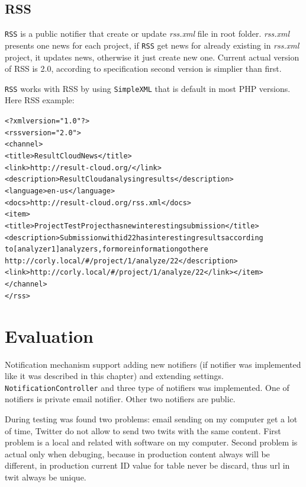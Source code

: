 \subsection{RSS}

\texttt{RSS} is a public notifier that create or update \emph{rss.xml} file in root folder. \emph{rss.xml} presents one news for each project, if \texttt{RSS} get news for already existing in \emph{rss.xml} project, it updates news, otherwise it just create new one. Current actual version of RSS is 2.0, according to specification \cite{rss} second version is simplier than first.

\texttt{RSS} works with RSS by using \texttt{SimpleXML} that is default in most PHP versions. Here RSS example:
\begin{alltt}
<?xml version="1.0"?>
<rss version="2.0"> 
<channel>
<title>ResultCloud News</title>
<link>http://result-cloud.org/</link>
<description>ResultCloud analysing results</description>
<language>en-us</language>
<docs>http://result-cloud.org/rss.xml</docs>
<item>
<title>Project TestProject has new interesting submission</title>
<description>Submission with id 22 has interesting results according\\ to [analyzer1] analyzers, for more information go there\\ http://corly.local/#/project/1/analyze/22</description>
<link>http://corly.local/#/project/1/analyze/22</link></item>
</channel>
</rss>

\end{alltt}

\section{Evaluation}

Notification mechanism support adding new notifiers (if notifier was implemented like it was described in this chapter) and extending settings. \texttt{NotificationController} and three type of notifiers was implemented. One of notifiers is private email notifier. Other two notifiers are public.

During testing was found two problems: email sending on my computer get a lot of time, Twitter do not allow to send two twits with the same content. First problem is a local and related with software on my computer. Second problem is actual only when debuging, because in production content always will be different, in production current ID value for table never be discard, thus url in twit always be unique. 

